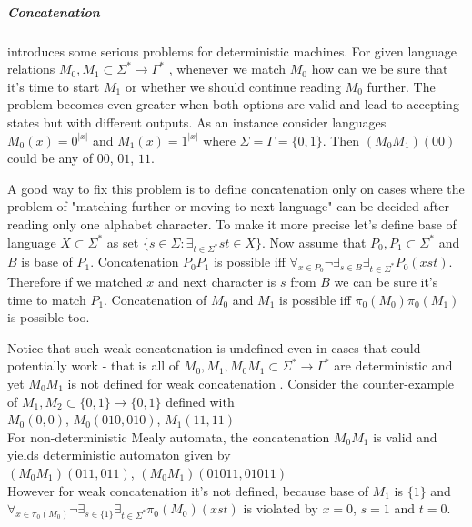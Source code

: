 \documentclass[12pt]{article}
\begin{document}
\subparagraph{Concatenation}  introduces some serious problems for deterministic machines. For given language relations $M_0,M_1 \subset \Sigma^* \rightarrow \Gamma^* $ , whenever we match $M_0$ how can we be sure that it's time to start $M_1$ or whether we should continue reading $M_0$ further. The problem becomes even greater when both options are valid and lead to accepting states but with different outputs. As an instance consider languages $M_0(x) =  0^{\vert x \vert} $ and $M_1(x) =  1^{\vert x \vert} $ where $\Sigma=\Gamma=\{0,1\}$. Then $(M_0M_1)(00)$ could be any of $00$, $01$, $11$. 


A good way to fix this problem is to define concatenation only on cases where the problem of "matching further or moving to next language" can be decided after reading only one alphabet character. To make it more precise let's define base of language $X \subset \Sigma^*$ as set $\{s\in\Sigma : \exists_{t\in\Sigma^*}st\in X\}$. Now assume that $P_0,P_1 \subset \Sigma^*$ and $B$ is base of $P_1$. Concatenation $P_0P_1$ is possible iff $\forall_{x\in P_0} \neg \exists_{s\in B} \exists_{t\in\Sigma^*} P_0(xst)$. Therefore if we matched $x$ and next character is $s$ from $B$ we can be sure it's time to match $P_1$. Concatenation of $M_0$ and $M_1$ is possible iff $\pi_0(M_0)\pi_0(M_1)$ is possible too. 

Notice that such weak concatenation is undefined even in cases that could potentially work - that is all of $M_0,M_1,M_0M_1 \subset \Sigma^* \rightarrow \Gamma^*$ are deterministic and yet $M_0M_1$ is not defined for weak concatenation . Consider the counter-example of $M_1,M_2 \subset \{0,1\}\rightarrow\{0,1\}$ defined with \\
$M_0(0,0)$,  $M_0(010,010)$, $M_1(11,11)$ \\
For non-deterministic Mealy automata, the concatenation $M_0M_1$ is valid and yields deterministic automaton given by \\
$(M_0M_1)(011,011)$,  $(M_0M_1)(01011,01011)$ \\
However for weak concatenation it's not defined, because base of $M_1$ is $\{1\}$ and  $\forall_{x\in \pi_0(M_0)} \neg \exists_{s\in\{1\}} \exists_{t\in\Sigma^*} \pi_0(M_0)(xst)$ is violated by $x=0$, $s=1$ and $t=0$.
\end{document}
